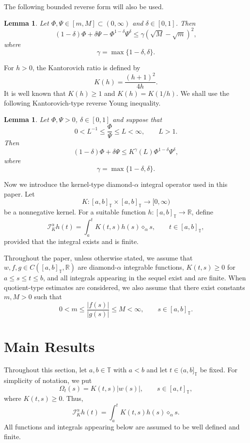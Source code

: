 \documentclass[11pt]{article}
\newtheorem{lemma}[theorem]{Lemma}
\begin{document}
The following bounded reverse form will also be used.

\begin{lemma}
Let $\Phi,\Psi\in[m,M]\subset(0,\infty)$ and $\delta\in[0,1]$. Then
\[
    (1-\delta)\Phi+\delta\Psi-\Phi^{1-\delta}\Psi^{\delta}
    \leq
    \gamma\left(\sqrt{M}-\sqrt{m}\right)^2,
\]
where
\[
    \gamma=\max\{1-\delta,\delta\}.
\]
\end{lemma}

For $h>0$, the Kantorovich ratio is defined by
\[
    K(h)=\frac{(h+1)^2}{4h}.
\]
It is well known that $K(h)\geq1$ and $K(h)=K(1/h)$. We shall use the following
Kantorovich-type reverse Young inequality.

\begin{lemma}
Let $\Phi,\Psi>0$, $\delta\in[0,1]$ and suppose that
\[
    0<L^{-1}\leq \frac{\Phi}{\Psi}\leq L<\infty,
    \qquad L>1.
\]
Then
\[
    (1-\delta)\Phi+\delta\Psi
    \leq
    K^{\gamma}(L)\Phi^{1-\delta}\Psi^{\delta},
\]
where
\[
    \gamma=\max\{1-\delta,\delta\}.
\]
\end{lemma}

Now we introduce the kernel-type diamond-$\alpha$ integral operator used in
this paper. Let
\[
    K:[a,b]_{\mathbb{T}}\times[a,b]_{\mathbb{T}}\to[0,\infty)
\]
be a nonnegative kernel. For a suitable function
$h:[a,b]_{\mathbb{T}}\to\mathbb{R}$, define
\[
    \mathcal{I}_{K}^{\alpha}h(t)
    =
    \int_a^t K(t,s)h(s)\diamond_{\alpha}s,
    \qquad t\in[a,b]_{\mathbb{T}},
\]
provided that the integral exists and is finite.

Throughout the paper, unless otherwise stated, we assume that
$w,f,g\in C([a,b]_{\mathbb{T}},\mathbb{R})$ are diamond-$\alpha$ integrable
functions, $K(t,s)\geq0$ for $a\leq s\leq t\leq b$, and all integrals appearing
in the sequel exist and are finite. When quotient-type estimates are considered,
we also assume that there exist constants $m,M>0$ such that
\[
    0<m\leq \frac{|f(s)|}{|g(s)|}\leq M<\infty,
    \qquad s\in[a,b]_{\mathbb{T}}.
\]


\section{Main Results}

Throughout this section, let $a,b\in\mathbb{T}$ with $a<b$ and let
$t\in(a,b]_{\mathbb{T}}$ be fixed. For simplicity of notation, we put
\[
    \Omega_t(s)=K(t,s)|w(s)|,\qquad s\in[a,t]_{\mathbb{T}},
\]
where $K(t,s)\geq0$. Thus,
\[
    \mathcal{I}_{K}^{\alpha}h(t)
    =
    \int_a^t K(t,s)h(s)\diamond_{\alpha}s.
\]
All functions and integrals appearing below are assumed to be well defined and
finite.
\end{document}
